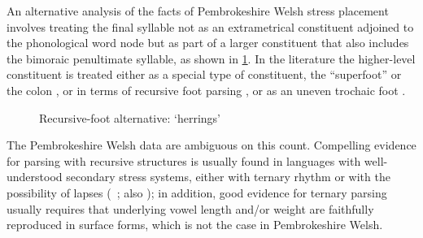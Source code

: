 An alternative analysis of the facts of Pembrokeshire Welsh stress placement involves treating the final syllable not as an extrametrical constituent adjoined to the phonological word node but as part of a larger constituent that also includes the bimoraic penultimate syllable, as shown in \cref{fig:recursive-footing}. In the literature the higher-level constituent is treated either as  a special type of constituent, \eg the \enquote{superfoot} \citep[\egm][]{everett03:_iambic_paumar} or the colon \citep[\egm][]{hammond87:_hungar,hayes1995,green-cls}, or in terms of recursive foot parsing \citep[\egm][]{itomester-fajl4,itomester-pword}, or as an uneven trochaic foot \citep{jacobs90,jacobs00,hulst96:_kamber,mellander04:_hl}.

\begin{figure}[htp]
  \centering
  \caption{Recursive-foot alternative: \ipa{[ˈskaːdan]} `herrings'}
  \label{fig:recursive-footing}
\end{figure}

The Pembrokeshire Welsh data are ambiguous on this count. Compelling evidence for parsing with recursive structures is usually found in languages with well\hyp understood secondary stress systems, either with ternary rhythm \citep[\egm][]{curt-diss,rice07} or with the possibility of lapses (\eg\ \citealp{kager-handouts}; \cf also \citealp{iosad08:_compl}); in addition, good evidence for ternary parsing usually requires that underlying vowel length and/or weight are faithfully reproduced in surface forms, which is not the case in Pembrokeshire Welsh.

